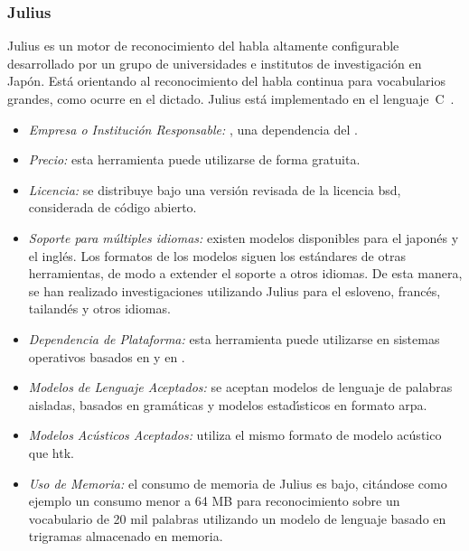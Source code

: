 \subsubsection{Julius}
\label{sec:julius}

Julius es un motor de reconocimiento del habla altamente configurable desarrollado por un grupo
de universidades e institutos de investigaci\'on en Jap\'on. Est\'a orientando al reconocimiento
del habla continua para vocabularios grandes, como ocurre en el dictado.
Julius est\'a implementado en el \mbox{lenguaje C \cite{JuliusHomePage}}.

\begin{itemize}
	\item \emph{Empresa o Instituci\'on Responsable:} ,
	una dependencia del .
	\item \emph{Precio:} esta herramienta puede utilizarse de forma gratuita.
	\item \emph{Licencia:} se distribuye bajo una versi\'on revisada de la licencia
	\gls{bsd}, considerada de c\'odigo abierto.
	\item \emph{Soporte para m\'ultiples idiomas:} existen modelos disponibles para
	el japon\'es y el ingl\'es. Los formatos de los modelos siguen los est\'andares de otras
	herramientas, de modo a extender el soporte a otros idiomas. De esta manera,
	se han realizado investigaciones utilizando Julius para el esloveno, franc\'es, tailand\'es
	y otros idiomas.
	\item \emph{Dependencia de Plataforma:} esta herramienta puede utilizarse en sistemas operativos
	basados en  y en .
	\item \emph{Modelos de Lenguaje Aceptados:} se aceptan modelos de lenguaje de palabras aisladas,
	basados en gram\'aticas y modelos estad{\'\i}sticos en formato \gls{arpa}.
	\item \emph{Modelos Ac\'usticos Aceptados:} utiliza el mismo formato de modelo ac\'ustico que \gls{htk}.
	\item \emph{Uso de Memoria:} el consumo de memoria de Julius es bajo, cit\'andose como ejemplo
	un consumo menor a 64 MB para reconocimiento sobre un vocabulario de 20 mil palabras utilizando
	un modelo de lenguaje basado en trigramas almacenado en memoria.
\end{itemize}